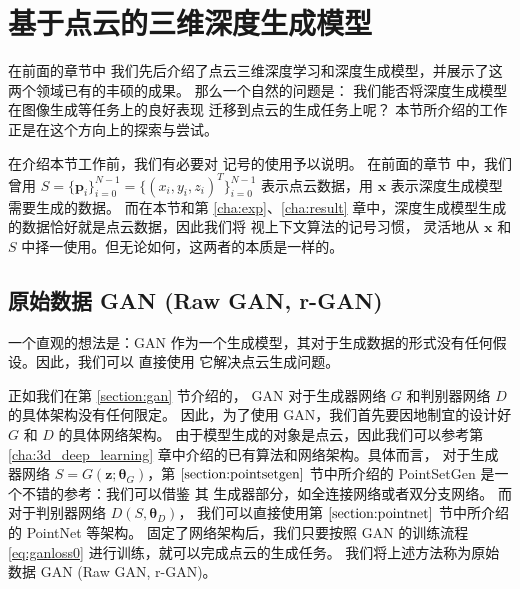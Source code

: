 
\section{基于点云的三维深度生成模型}
\label{section:gen3d}
在前面的章节中%
我们先后介绍了点云三维深度学习和深度生成模型，并展示了这两个领域已有的丰硕的成果。
那么一个自然的问题是：
我们能否将深度生成模型在图像生成等任务上的良好表现%
迁移到点云的生成任务上呢？
本节所介绍的工作  正是在这个方向上的探索与尝试。 %

在介绍本节工作前，我们有必要对%
记号的使用予以说明。
在前面的章节%
中，我们曾用 $S = \{\bm p_i\}_{i=0}^{N - 1}
	= \{(x_i, y_i, z_i)^T\}_{i=0}^{N - 1}$ 表示点云数据，用
$\bm x$ 表示深度生成模型需要生成的数据。
而在本节和第 \ref{cha:exp}、\ref{cha:result} 章中，深度生成模型生成的数据恰好就是点云数据，因此我们将
视上下文算法的记号习惯，%
灵活地从 $\bm x$ 和 $S$ 中择一使用。但无论如何，这两者的本质是一样的。


\subsection{原始数据 GAN (Raw GAN, r-GAN) \label{section:rgan}}
一个直观的想法是：GAN 作为一个生成模型，其对于生成数据的形式没有任何假设。因此，我们可以
直接使用 %
它解决点云生成问题。

正如我们在第 \ref{section:gan} 节介绍的， GAN 对于生成器网络 $G$ 和判别器网络 $D$ 的具体架构没有任何限定。
因此，为了使用 GAN，我们首先要因地制宜的设计好 $G$ 和 $D$ 的具体网络架构。
由于模型生成的对象是点云，因此我们可以参考第 \ref{cha:3d_deep_learning} 章中介绍的已有算法和网络架构。具体而言，
对于生成器网络 $S = G(\bm z; \bm \theta_G)$，第 $\ref{section:pointsetgen}$ 节中所介绍的 PointSetGen\cite{pointsetgen} 是一个不错的参考：我们可以借鉴 其 生成器部分，如全连接网络或者双分支网络。
而对于判别器网络 $D(S, \bm \theta_D)$，
我们可以直接使用第 $\ref{section:pointnet}$ 节中所介绍的 PointNet\cite{pointnet} 等架构。%
固定了网络架构后，我们只要按照 GAN 的训练流程 \eqref{eq:ganloss0} 进行训练，就可以完成点云的生成任务。
我们将上述方法称为原始数据 GAN (Raw GAN, r-GAN)。

